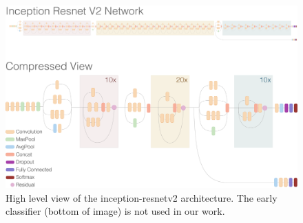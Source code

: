 \documentclass[12pt]{article}
\numberwithin{equation}{section}
\numberwithin{figure}{section}
\begin{document}
\begin{figure}
	\centering
	\captionsetup{justification=centering}
	\includegraphics[scale=0.25]{inception_resnetv2.png}
	\caption{High level view of the inception-resnetv2 architecture. The early classifier (bottom of image) is not used in our work.}
	\label{fig:incepresnetv2}
\end{figure}
\end{document}
